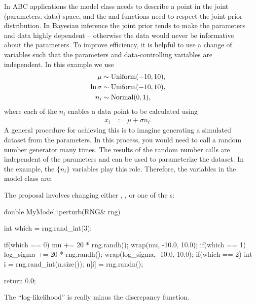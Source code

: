 \documentclass[article]{jss}
\begin{document}
In ABC applications the model class needs to describe a point in the joint
(parameters, data) space, and the  and 
functions need to respect the joint prior distribution.
In Bayesian inference the joint prior tends to make the
parameters and data highly dependent
-- otherwise the data would never be informative about the parameters.
To improve efficiency, it is helpful to use a change of variables such that
the parameters and data-controlling variables are independent. In this
example we use
\begin{align*}
\mu &\sim \textnormal{Uniform}(-10, 10),\\
\ln\sigma &\sim \textnormal{Uniform}(-10, 10),\\
n_i &\sim \textnormal{Normal}(0, 1),
\end{align*}
where each of the $n_i$ enables a data point to be calculated using
\begin{align*}
x_i &:= \mu + \sigma n_i.
\end{align*}
A general procedure for achieving this is to imagine generating a
simulated dataset from the parameters. In this process, you would need
to call a random number generator many times.
The results of the random number calls
are independent of the parameters and
can be used to parameterize the dataset. In the example,
the $\{n_i\}$ variables play this role.
Therefore, the variables in the model class are:
%
\begin{CodeChunk}
\begin{CodeInput}
class MyModel
{
    private:
        double mu, log_sigma;
        std::vector<double> n;
\end{CodeInput}
\end{CodeChunk}
%
The proposal involves changing either , , or
one of the s:
%
\begin{CodeChunk}
\begin{CodeInput}
double MyModel::perturb(RNG& rng)
{
    int which = rng.rand_int(3);

    if(which == 0)
    {
        mu += 20 * rng.randh();
        wrap(mu, -10.0, 10.0);
    }
    if(which == 1)
    {
        log_sigma += 20 * rng.randh();
        wrap(log_sigma, -10.0, 10.0);
    }
    if(which == 2)
    {
        int i = rng.rand_int(n.size());
        n[i] = rng.randn();
    }

    return 0.0;
}
\end{CodeInput}
\end{CodeChunk}
%
The ``log-likelihood'' is really minus the discrepancy function.
\end{document}
